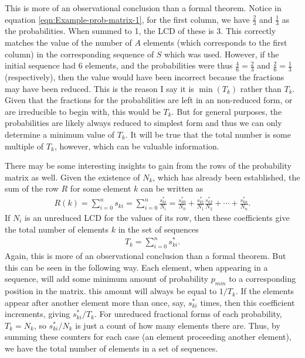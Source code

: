 This is more of an observational conclusion than a formal theorem. Notice in equation \ref{eqn:Example-prob-matrix-1}, for the first column, we have $\frac{2}{3}$ and $\frac{1}{3}$ as the probabilities. When summed to 1, the LCD of these is 3. This correctly matches the value of the number of $A$ elements (which corresponds to the first column) in the corresponding sequence of $S$ which was used. However, if the initial sequence had 6 elements, and the probabilities were thus $\frac{4}{6} = \frac{2}{3}$ and $\frac{2}{6} = \frac{1}{3}$ (respectively), then the value would have been incorrect because the fractions may have been reduced. This is the reason I say it is $\min (T_k)$ rather than $T_k$. Given that the fractions for the probabilities are left in an non-reduced form, or are irreducible to begin with, this would be $T_k$. But for general purposes, the probabilities are likely always reduced to simplest form and thus we can only determine a minimum value of $T_k$. It will be true that the total number is some multiple of $T_k$, however, which can be valuable information.

There may be some interesting insights to gain from the rows of the probability matrix as well. Given the existence of $N_k$, which has already been established, the sum of the row $R$ for some element $k$ can be written as
\begin{align}
	R(k) = \sum_{i=0}^{n} s_{ki} = \sum_{i=0}^{n} \frac{s^*_{ki}}{N_i} = \frac{s^*_{k0}}{N_0} + \frac{s^*_{k1}}{N_1}\frac{s^*_{k2}}{N_2} + \cdots + \frac{s^*_{kn}}{N_n}.
\end{align}
If $N_i$ is an unreduced LCD for the values of its row, then these coefficients give the total number of elements $k$ in the set of sequences
\begin{align}
	T_k = \sum_{i=0}^{n} s^*_{ki}. 
\end{align}
Again, this is more of an observational conclusion than a formal theorem. But this can be seen in the following way. Each element, when appearing in a sequence, will add some minimum amount of probability $p_{min}$ to a corresponding position in the matrix. this amount will always be equal to $1/T_k$. If the elements appear after another element more than once, say, $s^*_{ki}$ times, then this coefficient increments, giving $s^*_{ki}/T_k$. For unreduced fractional forms of each probability, $T_k = N_k$, so $s^*_{ki}/N_k$ is just a count of how many elements there are. Thus, by summing these counters for each case (an element proceeding another element), we have the total number of elements in a set of sequences.



